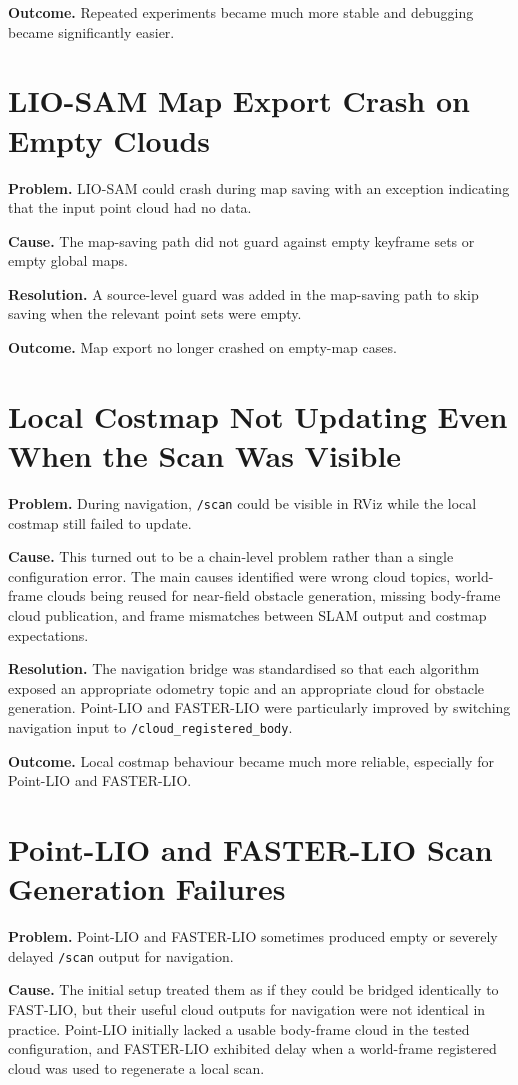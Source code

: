 \documentclass[12pt,a4paper]{report}
\begin{document}
\textbf{Outcome.} Repeated experiments became much more stable and debugging became significantly easier.

\section{LIO-SAM Map Export Crash on Empty Clouds}
\textbf{Problem.} LIO-SAM could crash during map saving with an exception indicating that the input point cloud had no data.

\textbf{Cause.} The map-saving path did not guard against empty keyframe sets or empty global maps.

\textbf{Resolution.} A source-level guard was added in the map-saving path to skip saving when the relevant point sets were empty.

\textbf{Outcome.} Map export no longer crashed on empty-map cases.

\section{Local Costmap Not Updating Even When the Scan Was Visible}
\textbf{Problem.} During navigation, \texttt{/scan} could be visible in RViz while the local costmap still failed to update.

\textbf{Cause.} This turned out to be a chain-level problem rather than a single configuration error. The main causes identified were wrong cloud topics, world-frame clouds being reused for near-field obstacle generation, missing body-frame cloud publication, and frame mismatches between SLAM output and costmap expectations.

\textbf{Resolution.} The navigation bridge was standardised so that each algorithm exposed an appropriate odometry topic and an appropriate cloud for obstacle generation. Point-LIO and FASTER-LIO were particularly improved by switching navigation input to \texttt{/cloud\_registered\_body}.

\textbf{Outcome.} Local costmap behaviour became much more reliable, especially for Point-LIO and FASTER-LIO.

\section{Point-LIO and FASTER-LIO Scan Generation Failures}
\textbf{Problem.} Point-LIO and FASTER-LIO sometimes produced empty or severely delayed \texttt{/scan} output for navigation.

\textbf{Cause.} The initial setup treated them as if they could be bridged identically to FAST-LIO, but their useful cloud outputs for navigation were not identical in practice. Point-LIO initially lacked a usable body-frame cloud in the tested configuration, and FASTER-LIO exhibited delay when a world-frame registered cloud was used to regenerate a local scan.
\end{document}
